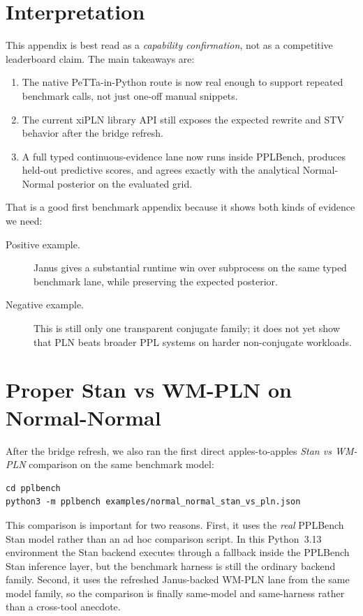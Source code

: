 \documentclass[11pt,openany]{report}
\begin{document}
\section{Interpretation}

This appendix is best read as a \emph{capability confirmation}, not as a
competitive leaderboard claim.  The main takeaways are:
\begin{enumerate}
\item The native PeTTa-in-Python route is now real enough to support repeated
benchmark calls, not just one-off manual snippets.
\item The current xiPLN library API still exposes the expected rewrite and
STV behavior after the bridge refresh.
\item A full typed continuous-evidence lane now runs inside PPLBench, produces
held-out predictive scores, and agrees exactly with the analytical
Normal-Normal posterior on the evaluated grid.
\end{enumerate}

That is a good first benchmark appendix because it shows both kinds of
evidence we need:
\begin{description}
\item[Positive example.] Janus gives a substantial runtime win over subprocess
on the same typed benchmark lane, while preserving the expected posterior.
\item[Negative example.] This is still only one transparent conjugate family;
it does not yet show that PLN beats broader PPL systems on harder
non-conjugate workloads.
\end{description}

\section{Proper Stan vs WM-PLN on Normal-Normal}
\label{app:pplbench-stan-pln}

After the bridge refresh, we also ran the first direct apples-to-apples
\emph{Stan vs WM-PLN} comparison on the same benchmark model:
\begin{lstlisting}
cd pplbench
python3 -m pplbench examples/normal_normal_stan_vs_pln.json
\end{lstlisting}

This comparison is important for two reasons.
First, it uses the \emph{real} PPLBench Stan model rather than an ad hoc
comparison script.  In this Python~3.13 environment the Stan backend executes
through a  fallback inside the PPLBench Stan inference layer,
but the benchmark harness is still the ordinary 
backend family.  Second, it uses the refreshed Janus-backed WM-PLN lane from
the same  model family, so the comparison is finally
same-model and same-harness rather than a cross-tool anecdote.
\end{document}

